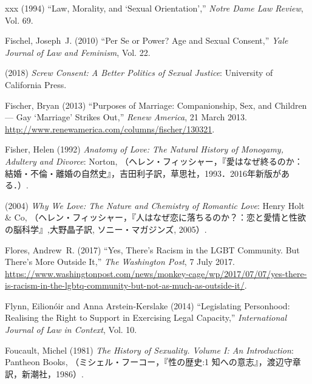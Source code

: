 \documentclass[]{jlreq} \usepackage{mystyle}
\begin{document}
\begin{thebibliography}{xxx}
 \bysame{}  (1994) ``Law, Morality, and `Sexual Orientation','' \textit{ Notre
  Dame Law Review}, Vol. 69.

Fischel, Joseph~J. (2010) ``Per Se or Power? Age and Sexual Consent,'' \textit{
  Yale Journal of Law and Feminism}, Vol. 22.

 \bysame{}  (2018)  \textit{ Screw Consent: A Better Politics of Sexual
  Justice}: University of California Press.

Fischer, Bryan (2013) ``Purposes of Marriage: Companionship, Sex, and Children
  --- Gay `Marriage' Strikes Out,'' \emph{Renew America}, 21 March 2013.
  \url{http://www.renewamerica.com/columns/fischer/130321}.

Fisher, Helen (1992)  \textit{ Anatomy of Love: The Natural History of
  Monogamy, Adultery and Divorce}: Norton,
  （ヘレン・フィッシャー，『愛はなぜ終るのか：結婚・不倫・離婚の自然史』，吉田利子訳，草思社，1993．2016年新版がある．）.

 \bysame{}  (2004)  \textit{ Why We Love: The Nature and Chemistry of Romantic
  Love}: Henry Holt \& Co,
  （ヘレン・フィッシャー，『人はなぜ恋に落ちるのか？：恋と愛情と性欲の脳科学』,大野晶子訳,
  ソニー・マガジンズ, 2005）.

Flores, Andrew~R. (2017) ``Yes, There's Racism in the LGBT Community. But
  There's More Outside It,'' \emph{The Washington Post}, 7 July 2017.
  \url{https://www.washingtonpost.com/news/monkey-cage/wp/2017/07/07/yes-there-is-racism-in-the-lgbtq-community-but-not-as-much-as-outside-it/}.

Flynn, Eilionóir and Anna Arstein-Kerslake (2014) ``Legislating Personhood:
  Realising the Right to Support in Exercising Legal Capacity,'' \textit{
  International Journal of Law in Context}, Vol. 10.

Foucault, Michel (1981)  \textit{ The History of Sexuality. Volume I: An
  Introduction}: Pantheon Books,
  （ミシェル・フーコー，『性の歴史:1
  知への意志』，渡辺守章訳，新潮社，1986）.


\end{thebibliography}
\end{document}
